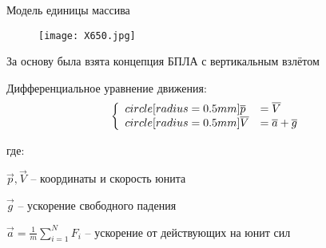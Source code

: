 \begin{tslide}{Модель единицы массива}
    
    \begin{wrapfigure}{r}{0.3\textwidth}
        \vspace{-1cm}
        \texttt{[image: X650.jpg]}
        \vspace{-2.8cm}
    \end{wrapfigure}

    За основу была взята концепция БПЛА с вертикальным взлётом

    Дифференциальное уравнение движения:
    $$
    \left\{
        \begin{array}{l l}
        \dot{\vec{p}}  & = \vec V \\
        \dot{\vec{V}}  & = \vec a + \vec g
        \end{array}
    \right.
    $$

    где: 

    $\vec p, \vec V$ -- координаты и скорость юнита
    
    $\vec g$ -- ускорение свободного падения

    $\vec a = \frac{1}{m} \sum_{i=1}^N F_i$ -- ускорение от действующих на юнит сил

\end{tslide}

